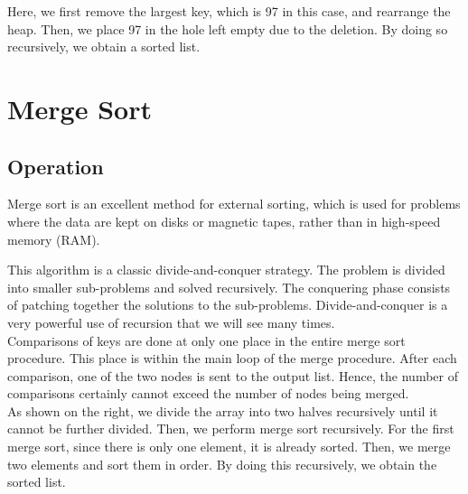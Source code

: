 Here, we first remove the largest key, which is 97 in this case, and rearrange the heap. Then, we place 97 in the hole left empty due to the deletion. By doing so recursively, we obtain a sorted list.

\section{Merge Sort}
\subsection{Operation}
Merge sort is an excellent method for external sorting, which is used for problems where the data are kept on disks or magnetic tapes, rather than in high-speed memory (RAM).

\begin{minipage}{0.4\textwidth}
This algorithm is a classic divide-and-conquer strategy. The problem is divided into smaller sub-problems and solved recursively. The conquering phase consists of patching together the solutions to the sub-problems. Divide-and-conquer is a very powerful use of recursion that we will see many times. \\[3pt]
Comparisons of keys are done at only one place in the entire merge sort procedure. This place is within the main loop of the merge procedure. After each comparison, one of the two nodes is sent to the output list. Hence, the number of comparisons certainly cannot exceed the number of nodes being merged. \\[3pt]
As shown on the right, we divide the array into two halves recursively until it cannot be further divided. Then, we perform merge sort recursively. For the first merge sort, since there is only one element, it is already sorted. Then, we merge two elements and sort them in order. By doing this recursively, we obtain the sorted list. 
\end{minipage}
